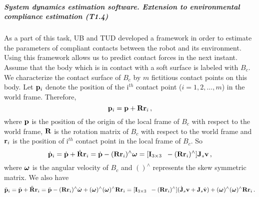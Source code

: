 \subparagraph{System dynamics estimation software. Extension to
environmental compliance estimation (T1.4)}

As a part of this task, UB and TUD developed a framework in order to estimate
the parameters of compliant contacts between the robot and its environment.
Using this framework allows us to predict contact forces in the next instant.
Assume that the body which is in contact with a soft surface is labeled with
$B_c$.  We characterize the contact surface of $B_c$ by $m$ fictitious contact
points on this body.  Let $\mathbf{p}_i$ denote the position of the i$^{th}$ contact
point ($i=1,2,\ldots,m$) in the world frame.  Therefore,
%
\begin{equation}
  \mathbf{p}_i = \mathbf{p} + \mathbf{R} \mathbf{r}_i \, ,
\end{equation}
%
where $\mathbf{p}$ is the position of the origin of the local frame of $B_c$ with
respect to the world frame, $\mathbf{R}$ is the rotation matrix of $B_c$ with respect
to the world frame and $\mathbf{r}_i$ is the position of i$^{th}$ contact point in
the local frame of $B_c$.  So
%
\begin{equation}
  \dot{\mathbf{p}}_i = \dot{\mathbf{p}} + \dot{\mathbf{R}} \mathbf{r}_i = \dot{\mathbf{p}} - (\mathbf{R}\mathbf{r}_i)^{\wedge}
  \boldsymbol{\omega} = [ \mathbf{I}_{3 \times 3} \; \; {}-(\mathbf{R}\mathbf{r}_i)^{\wedge} ] \mathbf{J}_s \mathbf{v} \, ,
  \label{pidot}
\end{equation}
%
where $\boldsymbol{\omega}$ is the angular velocity of $B_c$ and $()^{\wedge}$ represents
the skew symmetric matrix.  We also have
%
\begin{equation}
  \ddot{\mathbf{p}}_i = \ddot{\mathbf{p}} + \ddot{\mathbf{R}} \mathbf{r}_i = \ddot{\mathbf{p}} - (\mathbf{R}
  \mathbf{r}_i)^{\wedge} \dot{\boldsymbol{\omega}} + (\boldsymbol{\omega})^{\wedge} (\boldsymbol{\omega})^{\wedge} \mathbf{R}
  \mathbf{r}_i = [ \mathbf{I}_{3 \times 3} \; \; {}-(\mathbf{R} \mathbf{r}_i)^{\wedge}] (\dot{\mathbf{J}}_s \mathbf{v} +
  \mathbf{J}_s \dot{\mathbf{v}}) + (\boldsymbol{\omega})^{\wedge} (\boldsymbol{\omega})^{\wedge} \mathbf{R} \mathbf{r}_i \, .
  \label{piddot}
\end{equation}
%

